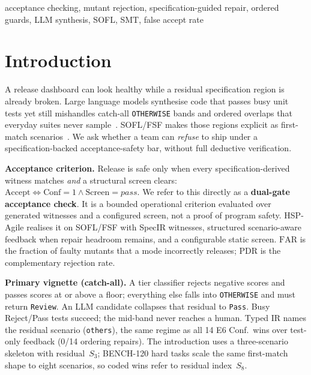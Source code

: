 \documentclass[10pt,conference]{IEEEtran}
\newcommand{\runin}[1]{\medskip\noindent\textbf{#1}\enspace}
\begin{document}
\begin{IEEEkeywords}
acceptance checking, mutant rejection, specification-guided repair,
ordered guards, LLM synthesis, SOFL, SMT, false accept rate
\end{IEEEkeywords}

\section{Introduction}
A release dashboard can look healthy while a residual specification region is
already broken.
Large language models synthesise code that passes busy unit tests yet still
mishandles catch-all \texttt{OTHERWISE} bands and ordered overlaps that everyday
suites never sample~\cite{chen2021codex,dakhel2023copilot,zhu1997specification}.
SOFL/FSF makes those regions explicit as first-match
scenarios~\cite{liu1998sofl,liu2004soflbook,li2022qrs_companion}.
We ask whether a team can \emph{refuse} to ship under a specification-backed
acceptance-safety bar, without full deductive verification.

\runin{Acceptance criterion.}
Release is safe only when every specification-derived witness matches
\emph{and} a structural screen clears:
$\mathrm{Accept}\Leftrightarrow\mathrm{Conf}{=}1\wedge\mathrm{Screen}{=}\mathit{pass}$.
We refer to this directly as a \textbf{dual-gate acceptance check}.
It is a bounded operational criterion evaluated over generated witnesses and a
configured screen, not a proof of program safety.
HSP-Agile realises it on SOFL/FSF with SpecIR witnesses, structured
scenario-aware feedback when repair headroom remains, and a configurable static
screen.
$\mathrm{FAR}$ is the fraction of faulty mutants that a mode incorrectly
releases; $\mathrm{PDR}$ is the complementary rejection rate.

\runin{Primary vignette (catch-all).}
A tier classifier rejects negative scores and passes scores at or above a
floor; everything else falls into \texttt{OTHERWISE} and must return
\texttt{Review}.
An LLM candidate collapses that residual to \texttt{Pass}.
Busy Reject/Pass tests succeed; the mid-band never reaches a human.
Typed IR names the residual scenario (\texttt{others}), the same regime as
all 14 E6 Conf.\ wins over test-only feedback (0/14 ordering repairs).
The introduction uses a three-scenario skeleton with residual~$S_3$; BENCH-120
hard tasks scale the same first-match shape to eight scenarios, so coded wins
refer to residual index~$S_8$.
\end{document}
